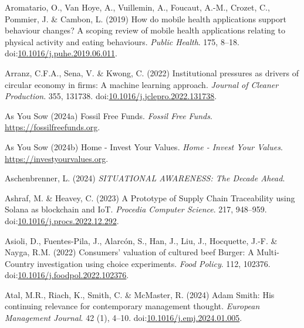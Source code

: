 \documentclass[
  letterpaper,
  DIV=11,
  numbers=noendperiod]{scrartcl}
\newlength{\cslhangindent}
\newenvironment{CSLReferences}[2] %
 {\begin{list}{}{%
  \setlength{\itemindent}{0pt}
  \setlength{\leftmargin}{0pt}
  \setlength{\parsep}{0pt}
  \ifodd #1
   \setlength{\leftmargin}{\cslhangindent}
   \setlength{\itemindent}{-1\cslhangindent}
  \fi
  \setlength{\itemsep}{#2\baselineskip}}}
 {\end{list}}
\begin{document}
\begin{CSLReferences}{0}{1}
Aromatario, O., Van Hoye, A., Vuillemin, A., Foucaut, A.-M., Crozet, C.,
Pommier, J. \& Cambon, L. (2019) How do mobile health applications
support behaviour changes? {A} scoping review of mobile health
applications relating to physical activity and eating behaviours.
\emph{Public Health}. 175, 8--18.
doi:\href{https://doi.org/10.1016/j.puhe.2019.06.011}{10.1016/j.puhe.2019.06.011}.

Arranz, C.F.A., Sena, V. \& Kwong, C. (2022) Institutional pressures as
drivers of circular economy in firms: {A} machine learning approach.
\emph{Journal of Cleaner Production}. 355, 131738.
doi:\href{https://doi.org/10.1016/j.jclepro.2022.131738}{10.1016/j.jclepro.2022.131738}.

As You Sow (2024a) Fossil {Free Funds}. \emph{Fossil Free Funds}.
\url{https://fossilfreefunds.org}.

As You Sow (2024b) Home - {Invest Your Values}. \emph{Home - Invest Your
Values}. \url{https://investyourvalues.org}.

Aschenbrenner, L. (2024) \emph{{SITUATIONAL AWARENESS}: {The Decade
Ahead}}.

Ashraf, M. \& Heavey, C. (2023) A {Prototype} of {Supply Chain
Traceability} using {Solana} as blockchain and {IoT}. \emph{Procedia
Computer Science}. 217, 948--959.
doi:\href{https://doi.org/10.1016/j.procs.2022.12.292}{10.1016/j.procs.2022.12.292}.

Asioli, D., Fuentes-Pila, J., Alarcón, S., Han, J., Liu, J., Hocquette,
J.-F. \& Nayga, R.M. (2022) Consumers' valuation of cultured beef
{Burger}: {A Multi-Country} investigation using choice experiments.
\emph{Food Policy}. 112, 102376.
doi:\href{https://doi.org/10.1016/j.foodpol.2022.102376}{10.1016/j.foodpol.2022.102376}.

Atal, M.R., Riach, K., Smith, C. \& McMaster, R. (2024) Adam {Smith}:
{His} continuing relevance for contemporary management thought.
\emph{European Management Journal}. 42 (1), 4--10.
doi:\href{https://doi.org/10.1016/j.emj.2024.01.005}{10.1016/j.emj.2024.01.005}.


\end{CSLReferences}
\end{document}
